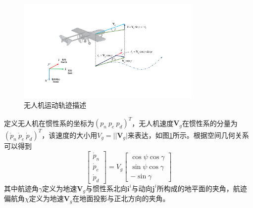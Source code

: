 \begin{figure}[htb]   
	\centering
	\includegraphics[width=0.8\textwidth]{figs/chp02/chp02_05_uav_course_frame.pdf}
	\caption{无人机运动轨迹描述}
	\label{fig:chp02_05_uav_course_frame}
\end{figure}

定义无人机在惯性系的坐标为$(p_n\ p_e\ p_d)^T$，无人机速度$\mathbf{V}_g$在惯性系的分量为$(\dot{p}_n\ \dot{p}_e\ \dot{p}_d)^T$，该速度的大小用$V_g = ||\mathbf{V}_g|$来表达，如图\ref{fig:chp02_05_uav_course_frame}所示。根据空间几何关系可以得到
\begin{equation}
\begin{bmatrix} \dot{p}_n \\\dot{p}_e \\ \dot{p}_d \end{bmatrix}  = {V}_g \begin{bmatrix} \cos \psi \cos \gamma \\ \sin \psi \cos \gamma  \\- \sin \gamma \end{bmatrix}
\end{equation}
其中航迹角$\gamma$定义为地速$\mathbf{V}_g$与惯性系北向$\mathbf{i}^i$与动向$\mathbf{j}^i$所构成的地平面的夹角，航迹偏航角$\chi$定义为地速$\mathbf{V}_g$在地面投影与正北方向的夹角。

